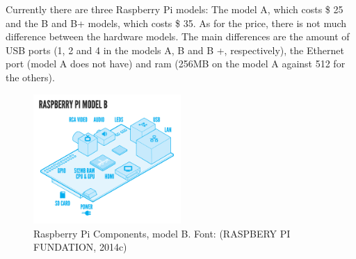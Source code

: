 \documentclass{acm_proc_article-sp}
\begin{document}
\newline
\newline
Currently there are three  Raspberry Pi models: The model A, which costs \$ 25 and the B and B+ models, which costs \$ 35. As for the price, there is not much difference between the hardware models. The main differences are the amount of USB ports (1, 2 and 4 in the models A, B and B +, respectively), the Ethernet port (model A does not have) and ram (256MB on the model A against 512 for the others).
\begin{figure}[h]
    \includegraphics[width=0.5\textwidth,natwidth=610,natheight=642]{pictures/RaspiModelB.png}
    \caption{Raspberry Pi Components, model B. Font: (RASPBERY PI FUNDATION, 2014c)
	\label{fig:raspi}
}
\end{figure}
\end{document}
